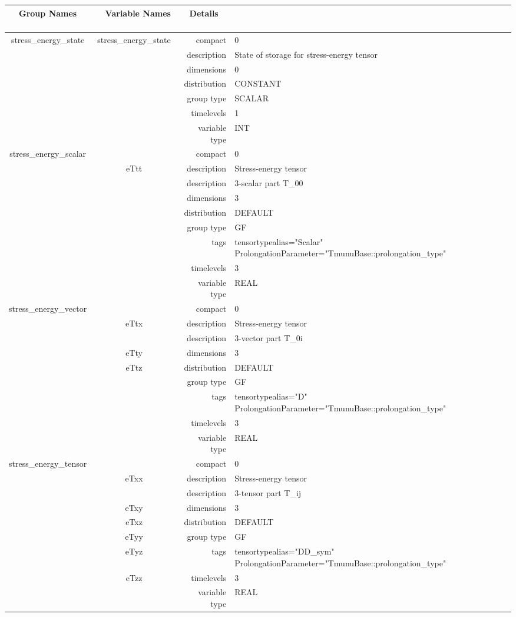 \documentclass{article}
\begin{document}
\begin{tabular*}{150mm}{|c|c@{\extracolsep{\fill}}|rl|} \hline 
~ {\bf Group Names} ~ & ~ {\bf Variable Names} ~  &{\bf Details} ~ & ~\\ 
\hline 
stress\_energy\_state & stress\_energy\_state & compact & 0 \\ 
 &  & description & State of storage for stress-energy tensor \\ 
 &  & dimensions & 0 \\ 
 &  & distribution & CONSTANT \\ 
 &  & group type & SCALAR \\ 
 &  & timelevels & 1 \\ 
 &  & variable type & INT \\ 
\hline 
stress\_energy\_scalar &  & compact & 0 \\ 
 & eTtt & description & Stress-energy tensor \\ 
& ~ & description &  3-scalar part T\_00 \\ 
 &  & dimensions & 3 \\ 
 &  & distribution & DEFAULT \\ 
 &  & group type & GF \\ 
 &  & tags & tensortypealias="Scalar" ProlongationParameter="TmunuBase::prolongation\_type" \\ 
 &  & timelevels & 3 \\ 
 &  & variable type & REAL \\ 
\hline 
stress\_energy\_vector &  & compact & 0 \\ 
 & eTtx & description & Stress-energy tensor \\ 
& ~ & description &  3-vector part T\_0i \\ 
 & eTty & dimensions & 3 \\ 
 & eTtz & distribution & DEFAULT \\ 
 &  & group type & GF \\ 
 &  & tags & tensortypealias="D" ProlongationParameter="TmunuBase::prolongation\_type" \\ 
 &  & timelevels & 3 \\ 
 &  & variable type & REAL \\ 
\hline 
stress\_energy\_tensor &  & compact & 0 \\ 
 & eTxx & description & Stress-energy tensor \\ 
& ~ & description &  3-tensor part T\_ij \\ 
 & eTxy & dimensions & 3 \\ 
 & eTxz & distribution & DEFAULT \\ 
 & eTyy & group type & GF \\ 
 & eTyz & tags & tensortypealias="DD\_sym" ProlongationParameter="TmunuBase::prolongation\_type" \\ 
 & eTzz & timelevels & 3 \\ 
 &  & variable type & REAL \\ 
\hline 
\end{tabular*} 
\end{document}
